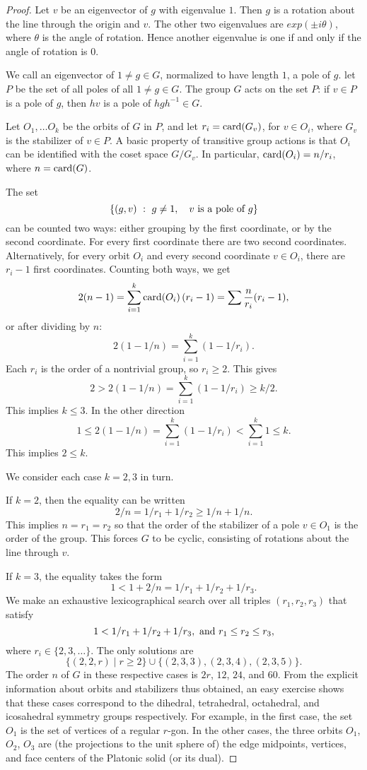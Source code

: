 \documentclass{amsart}
\begin{document}
\begin{proof}
  Let $v$ be an eigenvector
of $g$ with eigenvalue $1$.  Then $g$ is a rotation about the line through the origin and $v$.  The other
two eigenvalues are $exp(\pm i \theta)$, where $\theta$ is the angle of rotation.  Hence another eigenvalue
is one if and only if the angle of rotation is $0$.

We call an eigenvector of $1\ne g\in G$, normalized to have length $1$, a pole of $g$.  let $P$ be the
set of all poles of all $1\ne g\in G$.  
The group $G$ acts on the set $P$: if $v\in P$ is a pole of $g$, then $h v$ is a pole of $h g h^{-1}\in G$.

Let $O_1,\ldots O_k$ be the orbits of $G$ in $P$, and let $r_i=\card(G_v)$, for $v\in O_i$,
where $G_v$ is the stabilizer of $v\in P$.
A basic property
of transitive group actions is that $O_i$ can be identified with the coset space $G/G_v$.
In particular, $\card(O_i) = n/r_i$, where $n=\card(G)$.

The set
\[
\{(g,v)\mid g\ne 1,\quad v \hbox{ is a pole of } g\}
\]
can be counted two ways: either grouping by the first coordinate, or by the second coordinate.
For every first coordinate there are two second coordinates.  Alternatively,
for every orbit $O_i$ and every second coordinate $v\in O_i$, there
are $r_i - 1$ first coordinates.  Counting both ways, we get
\[
2 (n-1) = \sum_{i=1}^k \card{(O_i)}\, (r_i - 1) =  \sum \frac{n}{r_i}(r_i-1),
\]
or after dividing by $n$:
\[
2 (1 - 1/n) = \sum_{i=1}^k (1-1/r_i).
\]
Each $r_i$ is the order of a nontrivial group, so $r_i\ge2$.
This gives
\[
2 > 2 (1-1/n) =\sum_{i=1}^k (1-1/r_i) \ge k/2.
\]
This implies $k\le 3$.  
In the other direction
\[
1 \le 2(1-1/n) = \sum_{i=1}^k (1-1/r_i) < \sum_{i=1}^k 1 \le k.
\]
This implies $2\le k$.

We consider each case $k=2,3$ in turn.

If $k=2$, then the equality can be written
\[
2/n = 1/r_1 + 1/r_2 \ge 1/n + 1/n.
\]
This implies $n=r_1 = r_2$ so that the order of the stabilizer of a
pole $v\in O_1$ is the order of the group.  This forces $G$ to be
cyclic, consisting of rotations about the line through $v$.

If $k=3$, the equality takes the form
\[
1< 1 + 2/n = 1/r_1 + 1/r_2 + 1/r_3.
\]
We make an exhaustive lexicographical search over all triples
$(r_1,r_2,r_3)$ that satisfy
\[
1 < 1/r_1 + 1/r_2 + 1/r_3, \hbox{ and } r_1 \le r_2 \le r_3,
\]
where $r_i \in \{2,3,\ldots\}$.
The only solutions are 
\[
\{ (2,2,r)\mid r\ge 2\} \cup \{(2,3,3),(2,3,4),(2,3,5)\}.
\]
The order $n$ of $G$ in these respective cases is $2r$, $12$, $24$,
and $60$.  From the explicit information about orbits and stabilizers
thus obtained, an easy exercise shows that these cases correspond to
the dihedral, tetrahedral, octahedral, and icosahedral symmetry groups
respectively.  For example, in the first case, the set $O_1$ is the
set of vertices of a regular $r$-gon. In the other cases, the three
orbits $O_1$, $O_2$, $O_3$ are (the projections to the unit sphere of)
the edge midpoints, vertices, and face centers of the Platonic
solid (or its dual).
\end{proof}
\end{document}

